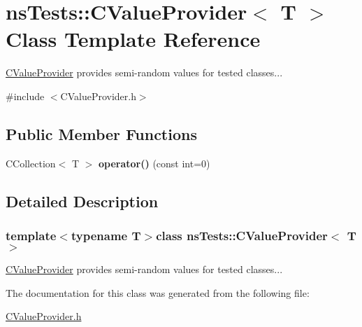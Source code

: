 \hypertarget{classnsTests_1_1CValueProvider}{\section{ns\+Tests\+:\+:C\+Value\+Provider$<$ T $>$ Class Template Reference}
\label{classnsTests_1_1CValueProvider}
}


\hyperlink{classnsTests_1_1CValueProvider}{C\+Value\+Provider} provides semi-\/random values for tested classes...  




{\ttfamily \#include $<$C\+Value\+Provider.\+h$>$}

\subsection*{Public Member Functions}
\begin{DoxyCompactItemize}
\item 
\hypertarget{classnsTests_1_1CValueProvider_a7d252e890f46fd65e202dca410cb7943}{C\+Collection$<$ T $>$ {\bfseries operator()} (const int=0)}\label{classnsTests_1_1CValueProvider_a7d252e890f46fd65e202dca410cb7943}

\end{DoxyCompactItemize}


\subsection{Detailed Description}
\subsubsection*{template$<$typename T$>$class ns\+Tests\+::\+C\+Value\+Provider$<$ T $>$}

\hyperlink{classnsTests_1_1CValueProvider}{C\+Value\+Provider} provides semi-\/random values for tested classes... 

The documentation for this class was generated from the following file\+:\begin{DoxyCompactItemize}
\item 
\hyperlink{CValueProvider_8h}{C\+Value\+Provider.\+h}\end{DoxyCompactItemize}
